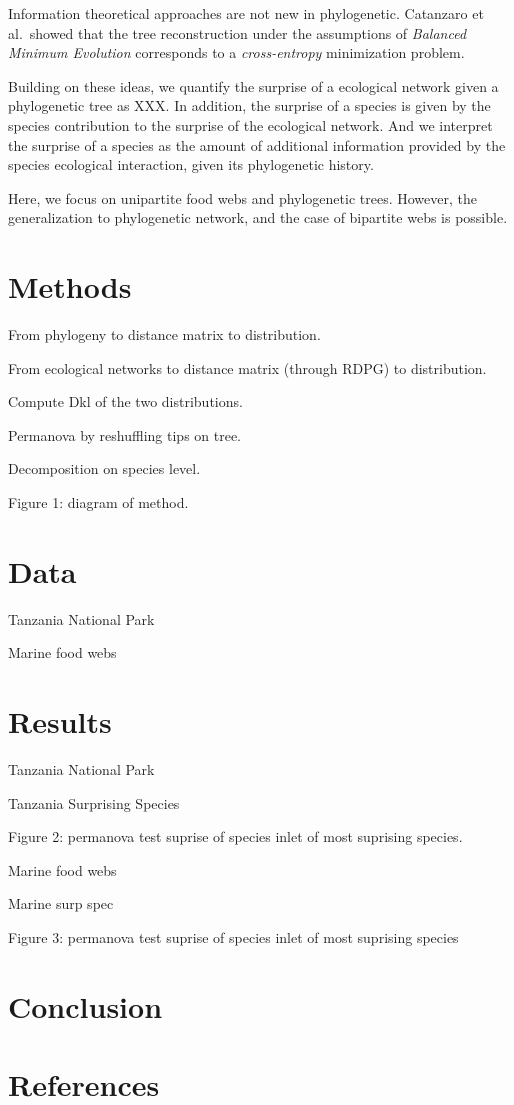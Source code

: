\documentclass[10pt,oneside]{article}
\begin{document}
Information theoretical approaches are not new in phylogenetic.
Catanzaro et al.~showed that the tree reconstruction under the
assumptions of \emph{Balanced Minimum Evolution} corresponds to a
\emph{cross-entropy} minimization problem.

Building on these ideas, we quantify the surprise of a ecological
network given a phylogenetic tree as XXX. In addition, the surprise of a
species is given by the species contribution to the surprise of the
ecological network. And we interpret the surprise of a species as the
amount of additional information provided by the species ecological
interaction, given its phylogenetic history.

Here, we focus on unipartite food webs and phylogenetic trees. However,
the generalization to phylogenetic network, and the case of bipartite
webs is possible.

\hypertarget{methods}{%
\section{Methods}\label{methods}}

From phylogeny to distance matrix to distribution.

From ecological networks to distance matrix (through RDPG) to
distribution.

Compute Dkl of the two distributions.

Permanova by reshuffling tips on tree.

Decomposition on species level.

Figure 1: diagram of method.

\hypertarget{data}{%
\section{Data}\label{data}}

Tanzania National Park

Marine food webs

\hypertarget{results}{%
\section{Results}\label{results}}

Tanzania National Park

Tanzania Surprising Species

Figure 2: permanova test \textbar\textbar{} suprise of species
\textbar\textbar{} inlet of most suprising species.

Marine food webs

Marine surp spec

Figure 3: permanova test \textbar\textbar{} suprise of species
\textbar\textbar{} inlet of most suprising species

\hypertarget{conclusion}{%
\section{Conclusion}\label{conclusion}}

\hypertarget{references}{%
\section{References}\label{references}}
\end{document}
